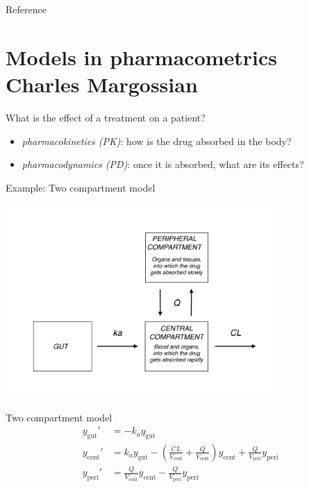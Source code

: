 \documentclass[presentation]{beamer}
\begin{document}
\begin{frame}[label={sec:org63d2573}]{Reference}

\end{frame}

\section{Models in pharmacometrics \\ \small{Charles Margossian}}
\label{sec:orgcf5b256}
\begin{frame}[label={sec:org52579c7}]{What is the effect of a treatment on a patient?}
\begin{itemize}
\item \emph{pharmacokinetics (PK)}: how is the drug absorbed in the body?
\item \emph{pharmacodynamics (PD)}: once it is absorbed, what are its effects?
\end{itemize}
\end{frame}

\begin{frame}[label={sec:org4794fb2}]{Example: Two compartment model}
\begin{latex}
\begin{center}
  \includegraphics[width=4in]{TwoCptNice.png}
\end{center}
\end{latex}
\end{frame}

\begin{frame}[label={sec:org49e2a34}]{Two compartment model}
\begin{align*}
   y_\mathrm{gut}' &= -k_a y_\mathrm{gut} \\
   y_\mathrm{cent}' &= k_a y_\mathrm{gut} - \left(\frac{CL}{V_\mathrm{cent}} + \frac{Q}{V_\mathrm{cent}} \right) y_\mathrm{cent} +  \frac{Q}{V_\mathrm{peri}} y_\mathrm{peri} \\
   y_\mathrm{peri}' &= \frac{Q}{V_\mathrm{cent}} y_\mathrm{cent} - \frac{Q}{V_\mathrm{peri}} y_\mathrm{peri}
   \label{eq:2Cpt}
\end{align*}
\end{frame}
\end{document}
